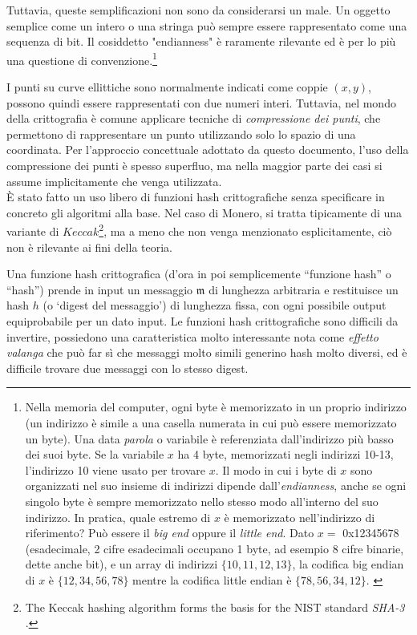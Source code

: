 Tuttavia, queste semplificazioni non sono da considerarsi un male. Un oggetto semplice come un intero o una stringa può sempre essere rappresentato come una sequenza di bit. Il cosiddetto "endianness" è raramente rilevante ed è per lo più una questione di convenzione.\footnote{Nella memoria del computer, ogni byte è memorizzato in un proprio indirizzo (un indirizzo è simile a una casella numerata in cui può essere memorizzato un byte). Una data \emph{parola} o variabile è referenziata dall’indirizzo più basso dei suoi byte. Se la variabile \(x\) ha 4 byte, memorizzati negli indirizzi 10-13, l’indirizzo 10 viene usato per trovare \(x\). Il modo in cui i byte di \(x\) sono organizzati nel suo insieme di indirizzi dipende dall’\emph{endianness}, anche se ogni singolo byte è sempre memorizzato nello stesso modo all’interno del suo indirizzo. In pratica, quale estremo di \(x\) è memorizzato nell’indirizzo di riferimento? Può essere il \emph{big end} oppure il \emph{little end}. Dato \(x = \) 0x12345678 (esadecimale, 2 cifre esadecimali occupano 1 byte, ad esempio 8 cifre binarie, dette anche bit), e un array di indirizzi \(\{10, 11, 12, 13\}\), la codifica big endian di \(x\) è \(\{12, 34, 56, 78\}\) mentre la codifica little endian è \(\{78, 56, 34, 12\}\). \cite{endianness}}

I punti su curve ellittiche sono normalmente indicati come coppie \((x, y)\),  possono quindi essere rappresentati con due numeri interi. Tuttavia, nel mondo della crittografia è comune applicare tecniche di {\em compressione dei punti}, che permettono di rappresentare un punto utilizzando solo lo spazio di una coordinata. Per l'approccio concettuale adottato da questo documento, l’uso della compressione dei punti è spesso superfluo, ma nella maggior parte dei casi si assume implicitamente che venga utilizzata.\\

È stato fatto un uso libero di funzioni hash crittografiche senza specificare in concreto gli algoritmi alla base. Nel caso di Monero, si tratta tipicamente di una variante di \(\mathit{Keccak}\)\footnote{\label{kekkak_note}The Keccak hashing algorithm forms the basis for the NIST standard {\em SHA-3} \cite{nist-sha3}.}, ma a meno che non venga menzionato esplicitamente, ciò non è rilevante ai fini della teoria.

Una funzione hash crittografica (d’ora in poi semplicemente “funzione hash” o “hash”) prende in input un messaggio $\mathfrak{m}$ di lunghezza arbitraria e restituisce un hash $h$ (o `digest del messaggio') di lunghezza fissa, con ogni possibile output equiprobabile per un dato input. Le funzioni hash crittografiche sono difficili da invertire, possiedono una caratteristica molto interessante nota come {\em effetto valanga} che può far sì che messaggi molto simili generino hash molto diversi, ed è difficile trovare due messaggi con lo stesso digest.

